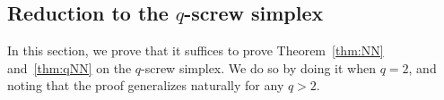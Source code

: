 \subsection{Reduction to the $q$-screw
simplex}\label{sec:reduction-to-screw}
In this section, we prove that it suffices to prove Theorem~\ref{thm:NN}
and~\ref{thm:qNN} on the $q$-screw simplex. We do so by doing it when
$q=2$, and noting that the proof generalizes naturally for any $q > 2$.

